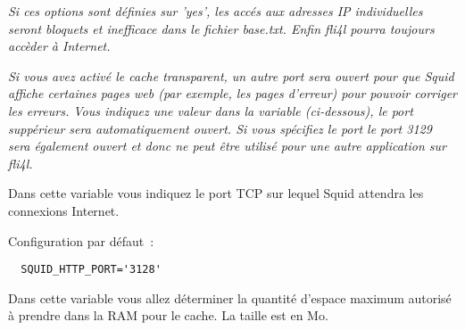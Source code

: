 \begin{description}

                 \emph{Si ces options sont définies sur 'yes', les accés
                                aux adresses IP individuelles seront bloquets
                                et inefficace dans le fichier base.txt. Enfin
                                fli4l pourra toujours accèder à Internet.}

                 \emph{Si vous avez activé le cache transparent, un autre port
                         sera ouvert pour que Squid affiche certaines pages web
                         (par exemple, les pages d'erreur) pour pouvoir corriger
                         les erreurs. Vous indiquez une valeur dans la variable
                          (ci-dessous), le port suppérieur
                         sera automatiquement ouvert. Si vous spécifiez le port
                          le port 3129 sera
                         également ouvert et donc ne peut être utilisé pour
                         une autre application sur fli4l.}



                Dans cette variable vous indiquez le port TCP sur lequel Squid
                attendra les connexions Internet.

                Configuration par défaut~:
\begin{verbatim}
  SQUID_HTTP_PORT='3128'
\end{verbatim}




                Dans cette variable vous allez déterminer la quantité d'espace
                maximum autorisé à prendre dans la RAM pour le cache. La taille
                est en Mo.


\end{description}
